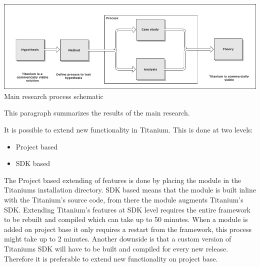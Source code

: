 \begin{centering}
\includegraphics[scale=0.5]{images/process.png}\\{Main research process schematic}\\
\end{centering}





This paragraph summarizes the results of the main research.



It is possible to extend new functionality in Titanium. This is done at two levels:
\begin{itemize}
	\item Project based
	\item SDK based
\end{itemize}
The Project based extending of features is done by placing the module in the Titaniums installation directory. SDK based means that the module is built inline with the Titanium's source code, from there the module augments Titanium's SDK.  Extending Titanium's features at SDK level requires the entire framework to be rebuilt and compiled which can take up to 50 minutes. When a module is added on project base it only requires a restart from the framework, this process might take up to 2 minutes. Another downside is that a custom version of Titaniums SDK will have to be built and compiled for every new release. Therefore it is preferable to extend new functionality on project base.



